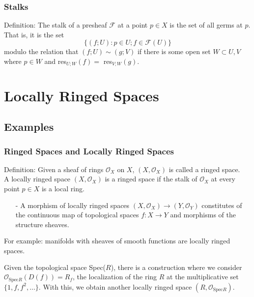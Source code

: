 \documentclass{beamer}
\begin{document}

\begin{frame}
\frametitle{Stalks}
    Definition: The stalk of a presheaf $\mathcal{F}$ at a point
    $p\in X$ is the set of all germs at $p$. That is, it is the set
    $$\{(f; U) : p \in U; f \in \mathcal{F}(U)\}$$
    modulo the relation that $(f; U) \sim (g; V)$ if there is some open set $W\subset
    U, V$ where $p \in W$ and res$_{U;W} (f) = $ res$_{V;W}(g)$.
\end{frame}



\section{Locally Ringed Spaces}
\subsection{Examples}

\begin{frame}
\frametitle{Ringed Spaces and Locally Ringed Spaces}
    Definition: Given a sheaf of rings $\mathcal{O}_X$ on $X$, $(X,\mathcal{O}_X)$ is
    called a ringed space.\\
    A locally ringed space $(X,\mathcal{O}_X)$ is a ringed space if the stalk
    of $\mathcal{O}_X$ at every point $p\in X$ is a local ring.

    \begin{itemize}
        \item[-] A morphism of locally ringed spaces $(X,\mathcal{O}_X)
        \longrightarrow (Y,\mathcal{O}_Y)$ constitutes of the continuous map of
        topological spaces $f: X\to Y$ and morphisms of the structure sheaves.
    \end{itemize}

    For example: manifolds with sheaves of smooth functions are locally ringed spaces.

    Given the topological space Spec($R$), there is a construction where we
    consider $\mathcal{O}_{\text{Spec} R}(D(f))= R_f$, the localization of the ring
    $R$ at the multiplicative set $\{1, f, f^2, \ldots\}$. With this, we obtain another
    locally ringed space $(R, \mathcal{O}_{\text{Spec} R})$.
\end{frame}

\end{document}
